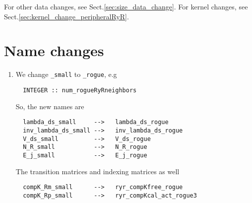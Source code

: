 %          



For other data changes, see Sect.\ref{sec:size_data_change}. For kernel changes,
see Sect.\ref{sec:kernel_change_peripheralRyR}.
 
\section{Name changes}

\begin{enumerate}
  \item We change \verb!_small! to \verb!_rogue!, e.g
  \begin{verbatim}
  INTEGER :: num_rogueRyRneighbors
  \end{verbatim}
  So, the new names are
  \begin{verbatim}
  lambda_ds_small     -->   lambda_ds_rogue
  inv_lambda_ds_small -->   inv_lambda_ds_rogue
  V_ds_small          -->   V_ds_rogue
  N_R_small           -->   N_R_rogue
  E_j_small           -->   E_j_rogue
  \end{verbatim}
  The transition matrices and indexing matrices as well
  \begin{verbatim}
  compK_Rm_small      -->   ryr_compKfree_rogue
  compK_Rp_small      -->   ryr_compKcal_act_rogue3
  \end{verbatim}
  
\end{enumerate}

